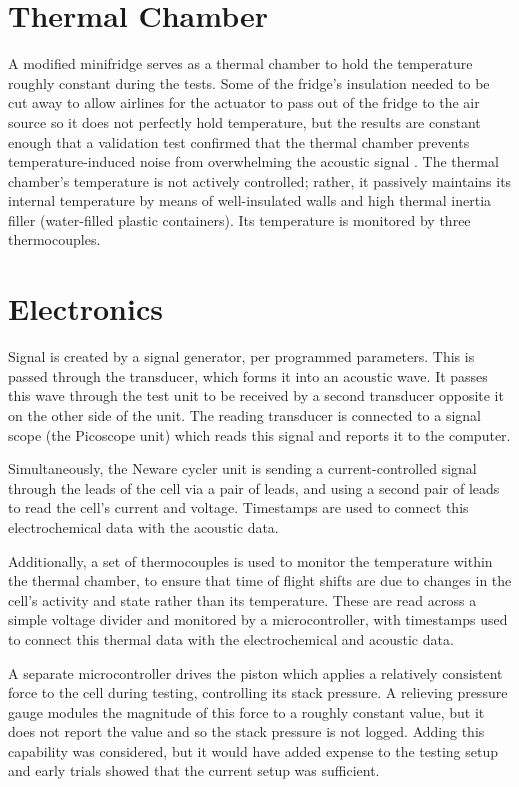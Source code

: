 \section{Thermal Chamber}
A modified minifridge serves as a thermal chamber to hold the temperature roughly constant during the tests. 
Some of the fridge's insulation needed to be cut away to allow airlines for the actuator to pass out of the fridge to the air source so it does not perfectly hold temperature, but the results are constant enough that a validation test confirmed that the thermal chamber prevents temperature-induced noise from overwhelming the acoustic signal . 
The thermal chamber's temperature is not actively controlled; rather, it passively maintains its internal temperature by means of well-insulated walls and high thermal inertia filler (water-filled plastic containers). 
Its temperature is monitored by three thermocouples.

\section{Electronics}


Signal is created by a signal generator, per programmed parameters. This is passed through the transducer, which forms it into an acoustic wave. It passes this wave through the test unit to be received by a second transducer opposite it on the other side of the unit. The reading transducer is connected to a signal scope (the Picoscope unit) which reads this signal and reports it to the computer.

Simultaneously, the Neware cycler unit is sending a current-controlled signal through the leads of the cell via a pair of leads, and using a second pair of leads to read the cell's current and voltage. Timestamps are used to connect this electrochemical data with the acoustic data.

Additionally, a set of thermocouples is used to monitor the temperature within the thermal chamber, to ensure that time of flight shifts are due to changes in the cell's activity and state rather than its temperature. These are read across a simple voltage divider and monitored by a microcontroller, with timestamps used to connect this thermal data with the electrochemical and acoustic data.

A separate microcontroller drives the piston which applies a relatively consistent force to the cell during testing, controlling its stack pressure. A relieving pressure gauge modules the magnitude of this force to a roughly constant value, but it does not report the value and so the stack pressure is not logged. Adding this capability was considered, but it would have added expense to the testing setup and early trials showed that the current setup was sufficient.

